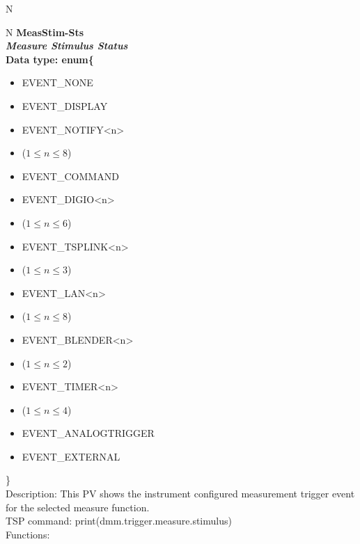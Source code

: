 \documentclass[openany]{article}
\begin{document}
\begin{tabular}{N}
		\end{tabular}

		\begin{tabular}{N}
			\hline
			\bfseries MeasStim-Sts\label{pv:measstim-sts} \\ \hline
			\emph{Measure Stimulus Status} \\
			Data type: enum\{\begin{itemize}[noitemsep]
				\small
				\item[] EVENT\_NONE
				\item[] EVENT\_DISPLAY
				\item[] EVENT\_NOTIFY\textless n\textgreater
				\item[] ($1\leq n\leq 8$)
				\item[] EVENT\_COMMAND
				\item[] EVENT\_DIGIO\textless n\textgreater
				\item[] ($1\leq n\leq 6$)
				\item[] EVENT\_TSPLINK\textless n\textgreater
				\item[] ($1\leq n\leq 3$)
				\item[] EVENT\_LAN\textless n\textgreater
				\item[] ($1\leq n\leq 8$)
				\item[] EVENT\_BLENDER\textless n\textgreater
				\item[] ($1\leq n\leq 2$)
				\item[] EVENT\_TIMER\textless n\textgreater
				\item[] ($1\leq n\leq 4$)
				\item[] EVENT\_ANALOGTRIGGER
				\item[] EVENT\_EXTERNAL
			\end{itemize}\} \\
			Description: This PV shows the instrument configured measurement trigger event for the selected measure function. \\
			TSP command: print(dmm.trigger.measure.stimulus) \\
			Functions: \\
			\arrayrulecolor{\FuncTableBorderColor}

		\end{tabular}
\end{document}

